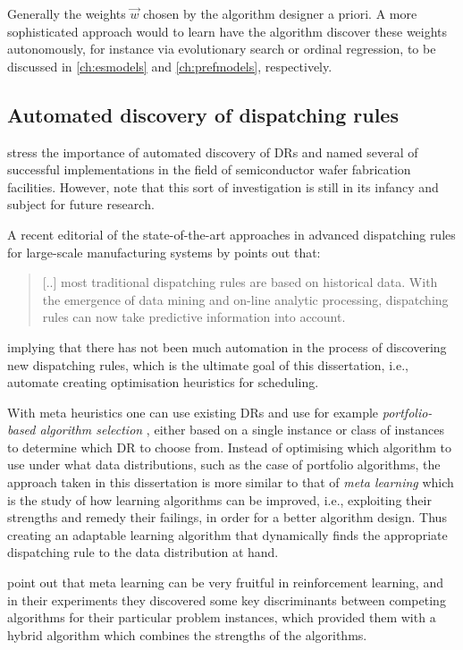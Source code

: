 Generally the weights $\vec{w}$ chosen by the algorithm designer a priori. 
A more sophisticated approach would to learn have the algorithm discover these weights autonomously, for instance via evolutionary search or ordinal regression, to be discussed in \cref{ch:esmodels} and \cref{ch:prefmodels}, respectively.

\subsection{Automated discovery of dispatching rules}
\citet{Monch13} stress the importance of automated discovery of DRs and named several of successful implementations in the field of semiconductor wafer fabrication facilities. 
However, \citeauthor{Monch13} note that this sort of investigation is still in its infancy and subject for future research.

A recent editorial of the state-of-the-art approaches in advanced dispatching rules for large-scale manufacturing systems by \citet{Chen13} points out that:
\begin{quote}
[..] most traditional dispatching rules are based on historical data. With the emergence of data mining and on-line analytic processing, dispatching rules can now take predictive information into account.
\end{quote}
implying that there has not been much automation in the process of discovering new dispatching rules, which is the ultimate goal of this dissertation, i.e., automate creating optimisation heuristics for scheduling. 

With meta heuristics one can use existing DRs and use for example \textit{portfolio-based algorithm selection} \citep{Rice76,Gomes01}, either based on a single instance or class of instances \citep{Xu07} to determine which DR to choose from. 
Instead of optimising which algorithm to use under what data distributions, such as the case of portfolio algorithms, the approach taken in this dissertation is more similar to that of \emph{meta learning} \citep{Vilalta02} which is the study of how learning algorithms can be improved, i.e., exploiting their strengths and remedy their failings, in order for a better algorithm design. Thus creating an adaptable learning algorithm that dynamically finds the appropriate dispatching rule  to the data distribution at hand. 

\citet{Kalyanakrishnan11} point out that meta learning can be very fruitful in reinforcement learning, and in their experiments they discovered some key discriminants between competing algorithms for their particular problem instances, which provided them with a hybrid algorithm which combines the strengths of the algorithms.

